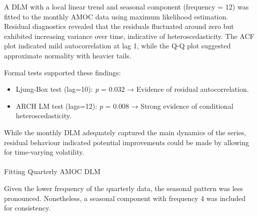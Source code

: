 \documentclass[
  11pt,
]{article}
\makeatletter
\let\oldparagraph\paragraph
\renewcommand{\paragraph}{
    \@ifstar
      \xxxParagraphStar
      \xxxParagraphNoStar
  }
\newcommand{\xxxParagraphStar}[1]{\oldparagraph*{#1}\mbox{}}
\newcommand{\xxxParagraphNoStar}[1]{\oldparagraph{#1}\mbox{}}
\newenvironment{Shaded}{\begin{snugshade}}{\end{snugshade}}
\newcommand{\AttributeTok}[1]{\textcolor[rgb]{0.40,0.45,0.13}{#1}}
\newcommand{\ControlFlowTok}[1]{\textcolor[rgb]{0.00,0.23,0.31}{\textbf{#1}}}
\newcommand{\DecValTok}[1]{\textcolor[rgb]{0.68,0.00,0.00}{#1}}
\newcommand{\FunctionTok}[1]{\textcolor[rgb]{0.28,0.35,0.67}{#1}}
\newcommand{\NormalTok}[1]{\textcolor[rgb]{0.00,0.23,0.31}{#1}}
\newcommand{\OtherTok}[1]{\textcolor[rgb]{0.00,0.23,0.31}{#1}}
\newcommand{\SpecialCharTok}[1]{\textcolor[rgb]{0.37,0.37,0.37}{#1}}
\newcommand{\StringTok}[1]{\textcolor[rgb]{0.13,0.47,0.30}{#1}}
\makeatother
\begin{document}
A DLM with a local linear trend and seasonal component (frequency = 12)
was fitted to the monthly AMOC data using maximum likelihood estimation.
Residual diagnostics revealed that the residuals fluctuated around zero
but exhibited increasing variance over time, indicative of
heteroscedasticity. The ACF plot indicated mild autocorrelation at lag
1, while the Q-Q plot suggested approximate normality with heavier
tails.

Formal tests supported these findings:

\begin{itemize}
\item
  Ljung-Box test (lag=10): \emph{p} = 0.032 → Evidence of residual
  autocorrelation.
\item
  ARCH LM test (lags=12): \emph{p} = 0.008 → Strong evidence of
  conditional heteroscedasticity.
\end{itemize}

While the monthly DLM adequately captured the main dynamics of the
series, residual behaviour indicated potential improvements could be
made by allowing for time-varying volatility.

\paragraph{Fitting Quarterly AMOC DLM}\label{fitting-quarterly-amoc-dlm}

Given the lower frequency of the quarterly data, the seasonal pattern
was less pronounced. Nonetheless, a seasonal component with frequency 4
was included for consistency.

\begin{Shaded}
\end{Shaded}
\end{document}
